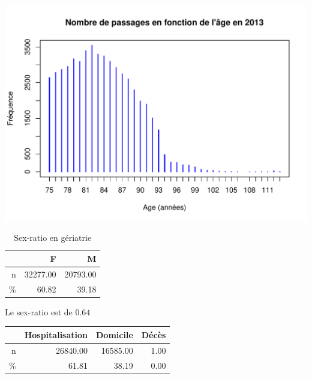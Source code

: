 \documentclass[12pt,english,french,twoside]{book}\usepackage[]{graphicx}\usepackage[]{color}
\makeatletter
\def\maxwidth{ %
  \ifdim\Gin@nat@width>\linewidth
    \linewidth
  \else
    \Gin@nat@width
  \fi
}
\newenvironment{knitrout}{}{} %
\makeatother
\begin{document}

\begin{knitrout}
\color{fgcolor}
\includegraphics[width=\maxwidth]{figure/passages_geriatrie-1} 

\end{knitrout}


\begin{table}[ht]
\centering
\begin{tabular}{rrr}
  \hline
 & F & M \\ 
  \hline
n & 32277.00 & 20793.00 \\ 
  \% & 60.82 & 39.18 \\ 
   \hline
\end{tabular}
\caption[Sex-ratio en gériatrie]{Sex-ratio en gériatrie} 
\label{tab:ger_sr}
\end{table}



Le sex-ratio est de $0.64$


\begin{table}[ht]
\centering
\begin{tabular}{rrrr}
  \hline
 & Hospitalisation & Domicile & Décès \\ 
  \hline
n & 26840.00 & 16585.00 & 1.00 \\ 
  \% & 61.81 & 38.19 & 0.00 \\ 
   \hline
\end{tabular}
\end{table}
\end{document}
